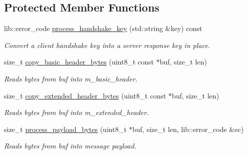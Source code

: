 \subsection*{Protected Member Functions}
\begin{DoxyCompactItemize}
\item 
\mbox{\label{classwebsocketpp_1_1processor_1_1hybi13_afe3d2731a39faebab5f927a13e26fb8c}} 
lib\+::error\+\_\+code \mbox{\hyperlink{classwebsocketpp_1_1processor_1_1hybi13_afe3d2731a39faebab5f927a13e26fb8c}{process\+\_\+handshake\+\_\+key}} (std\+::string \&key) const
\begin{DoxyCompactList}\small\item\em Convert a client handshake key into a server response key in place. \end{DoxyCompactList}\item 
\mbox{\label{classwebsocketpp_1_1processor_1_1hybi13_a737c86ee2ec91709052e69f22083afb9}} 
size\+\_\+t \mbox{\hyperlink{classwebsocketpp_1_1processor_1_1hybi13_a737c86ee2ec91709052e69f22083afb9}{copy\+\_\+basic\+\_\+header\+\_\+bytes}} (uint8\+\_\+t const $\ast$buf, size\+\_\+t len)
\begin{DoxyCompactList}\small\item\em Reads bytes from buf into m\+\_\+basic\+\_\+header. \end{DoxyCompactList}\item 
\mbox{\label{classwebsocketpp_1_1processor_1_1hybi13_a79fbd0b0670ab1c345ddbb4db76f6a0b}} 
size\+\_\+t \mbox{\hyperlink{classwebsocketpp_1_1processor_1_1hybi13_a79fbd0b0670ab1c345ddbb4db76f6a0b}{copy\+\_\+extended\+\_\+header\+\_\+bytes}} (uint8\+\_\+t const $\ast$buf, size\+\_\+t len)
\begin{DoxyCompactList}\small\item\em Reads bytes from buf into m\+\_\+extended\+\_\+header. \end{DoxyCompactList}\item 
size\+\_\+t \mbox{\hyperlink{classwebsocketpp_1_1processor_1_1hybi13_aa7eece3f48840535f41b625061fa7867}{process\+\_\+payload\+\_\+bytes}} (uint8\+\_\+t $\ast$buf, size\+\_\+t len, lib\+::error\+\_\+code \&ec)
\begin{DoxyCompactList}\small\item\em Reads bytes from buf into message payload. \end{DoxyCompactList}\item 

\end{DoxyCompactItemize}
